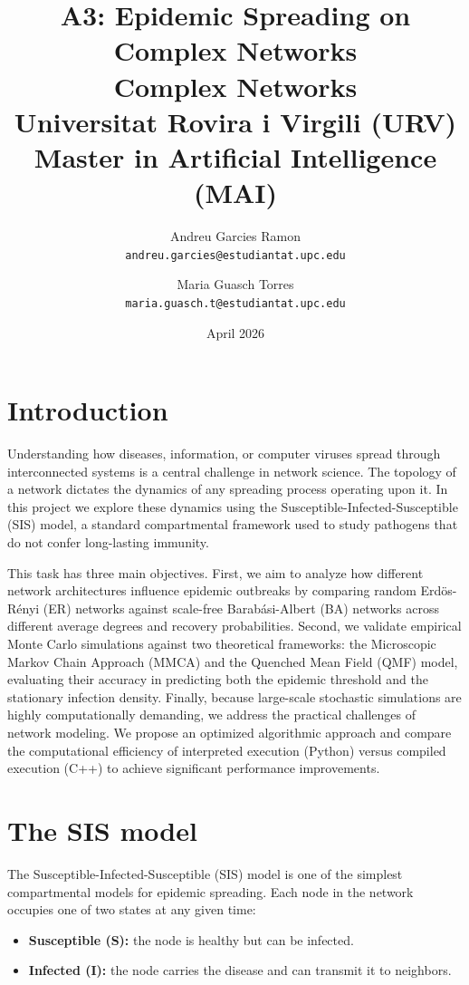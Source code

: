 \documentclass{article}
\title{
    \textbf{A3: Epidemic Spreading on Complex Networks}\\
    \large Complex Networks\\
    \small Universitat Rovira i Virgili (URV)\\
    \small Master in Artificial Intelligence (MAI)
}
\author{
    Andreu Garcies Ramon\\
    \texttt{andreu.garcies@estudiantat.upc.edu}
    \and
    Maria Guasch Torres\\
    \texttt{maria.guasch.t@estudiantat.upc.edu}
}
\date{April 2026}
\begin{document}
\maketitle

\section{Introduction}

Understanding how diseases, information, or computer viruses spread through interconnected systems is a central challenge in network science. The topology of a network dictates the dynamics of any spreading process operating upon it. In this project we explore these dynamics using the Susceptible-Infected-Susceptible (SIS) model, a standard compartmental framework used to study pathogens that do not confer long-lasting immunity.

This task has three main objectives. First, we aim to analyze how different network architectures influence epidemic outbreaks by comparing random Erdös-Rényi (ER) networks against scale-free Barabási-Albert (BA) networks across different average degrees and recovery probabilities. Second, we validate empirical Monte Carlo simulations against two theoretical frameworks: the Microscopic Markov Chain Approach (MMCA) and the Quenched Mean Field (QMF) model, evaluating their accuracy in predicting both the epidemic threshold and the stationary infection density. Finally, because large-scale stochastic simulations are highly computationally demanding, we address the practical challenges of network modeling. We propose an optimized algorithmic approach and compare the computational efficiency of interpreted execution (Python) versus compiled execution (C++) to achieve significant performance improvements.

\section{The SIS model}

The Susceptible-Infected-Susceptible (SIS) model is one of the simplest compartmental models for epidemic spreading. Each node in the network occupies one of two states at any given time:

\begin{itemize}
    \item \textbf{Susceptible (S):} the node is healthy but can be infected.
    \item \textbf{Infected (I):} the node carries the disease and can transmit it to neighbors.
\end{itemize}
\end{document}

